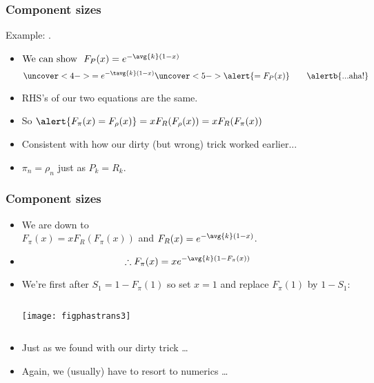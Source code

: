 \begin{frame}[label=]
  \frametitle{Component sizes}

  \alert{Example}: .
  \begin{itemize}
  \item<1->
    $
    \mbox{We can show \ }
    F_P(x) = e^{-\avg{k}(1-x)}
    $
    $$
    \uncover<4->{
      = e^{-\tavg{k}(1-x)}
    }
    \uncover<5->{
      \alert{= F_P(x)} \qquad \alertb{\mbox{...aha!}}
    }
    $$
    \item<6->
      RHS's of our two equations are the same.
    \item<7-> 
      So $\alert{F_\pi(x) = F_\rho(x)} = x F_R(F_\rho(x)) = x F_R(F_\pi(x))$
    \item<8->
      Consistent with how our dirty (but wrong) trick worked earlier...
    \item<9->
      $\pi_n = \rho_n$ just as $P_k = R_k$.
  \end{itemize}

\end{frame}


\begin{frame}[label=]
  \frametitle{Component sizes}

  \begin{itemize}
  \item<1-> 
    We are down to\\
    $
    F_\pi(x) = x F_R(F_\pi(x))
    $
    and
    $
    F_R(x) = e^{-\avg{k}(1-x)}
    $.
  \item<2->
    $$
    \therefore
    F_\pi(x) = x e^{-\avg{k}(1-F_\pi(x))}
    $$
  \item<3-> We're first after $S_1 = 1 - F_\pi(1)$ so set $x=1$
    and replace $F_\pi(1)$ by $1-S_1$:
    \begin{columns}
      \begin{overprint}
        \texttt{[image: figphastrans3]}
      \end{overprint}
    \end{columns}
  \item<5-> Just as we found with our dirty trick \ldots
  \item<6-> Again, we (usually) have to resort to numerics \ldots
  \end{itemize}

\end{frame}

